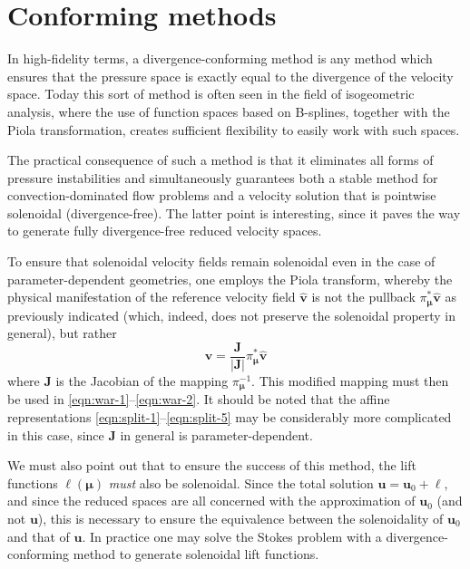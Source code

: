 \documentclass[onecolumn, twoside, a4paper, 11pt]{article}
\begin{document}
\section{Conforming methods}
\label{sec:conforming}

In high-fidelity terms, a divergence-conforming method is any method which
ensures that the pressure space is exactly equal to the divergence of the
velocity space. Today this sort of method is often seen in the field of
isogeometric analysis, where the use of function spaces based on B-splines,
together with the Piola transformation, creates sufficient flexibility to easily
work with such spaces.

The practical consequence of such a method is that it eliminates all forms of
pressure instabilities and simultaneously guarantees both a stable method for
convection-dominated flow problems and a velocity solution that is pointwise
solenoidal (divergence-free). The latter point is interesting, since it paves
the way to generate fully divergence-free reduced velocity spaces.

To ensure that solenoidal velocity fields remain solenoidal even in the case of
parameter-dependent geometries, one employs the Piola transform, whereby the
physical manifestation of the reference velocity field $\hat{\bm v}$ is not the pullback
$\pi_{\bm \mu}^* \hat{\bm v}$ as previously indicated (which, indeed, does not
preserve the solenoidal property in general), but rather
\begin{equation}
  \label{eqn:piola}
  \bm v = \frac{\bm J}{|\bm J|} \pi_{\bm \mu}^* \hat{\bm v}
\end{equation}
where $\bm J$ is the Jacobian of the mapping $\pi_{\bm \mu}^{-1}$. This modified
mapping must then be used in \eqref{eqn:war-1}--\eqref{eqn:war-2}. It should be
noted that the affine representations \eqref{eqn:split-1}--\eqref{eqn:split-5}
may be considerably more complicated in this case, since $\bm J$ in general is
parameter-dependent.

We must also point out that to ensure the success of this method, the lift
functions $\bm \ell(\bm \mu)$ \emph{must} also be solenoidal. Since the total
solution $\bm u = \bm u_0 + \bm \ell$, and since the reduced spaces are all
concerned with the approximation of $\bm u_0$ (and not $\bm u$), this is
necessary to ensure the equivalence between the solenoidality of $\bm u_0$ and
that of $\bm u$. In practice one may solve the Stokes problem with a
divergence-conforming method to generate solenoidal lift functions.
\end{document}
